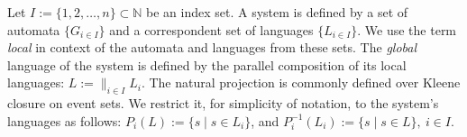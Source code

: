 \documentclass[a4paper, 10pt, conference]{ieeeconf}
\begin{document}
Let $I := \{1,2,\ldots,n\} \subset  \mathbb{N}$ be an index set. A system is
defined by a set of automata $\{G_{i \in I}\}$ and a correspondent set of
languages $\{L_{i \in I}\}$. We use the term \emph{local} in context of the
automata and languages from these sets. The \emph{global} language of the system
is defined by the parallel composition \cite{cassandras_introduction_2010} of
its local languages:
$L := \parallel_{i \in I} L_i$.
The natural projection is commonly defined over Kleene closure on event sets.
We restrict it, for simplicity of notation, to the system's languages as
follows: $P_i(L) := \{s\mid s\in L_{i}\}$, and $P_i^{-1}(L_{i}) := \{s \mid s
\in L\}, ~i \in I$.


% 
% 
\end{document}

